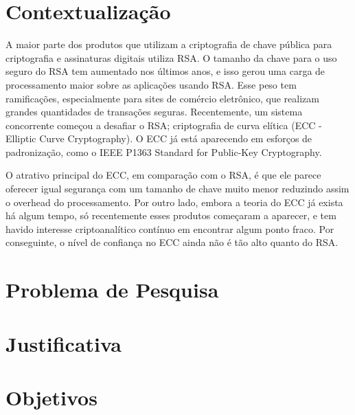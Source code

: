 









\frenchspacing 
\imprimircapa

\textual

\section*{Contextualização}

A maior parte dos produtos que utilizam a criptografia de chave pública para criptografia e assinaturas digitais utiliza RSA. O tamanho da chave para o uso seguro do RSA tem aumentado nos últimos anos, e isso gerou uma carga de processamento maior sobre as aplicações usando RSA. Esse peso tem ramificações, especialmente para sites de comércio eletrônico, que realizam grandes quantidades de transações seguras. Recentemente, um sistema concorrente começou a desafiar o RSA; criptografia de curva elítica (ECC - Elliptic Curve Cryptography). O ECC já está aparecendo em esforços de padronização, como o IEEE P1363 Standard for Public-Key Cryptography. \cite{Stallings:2011}

O atrativo principal do ECC, em comparação com o RSA, é que ele parece oferecer igual segurança com um tamanho de chave muito menor reduzindo assim o overhead do processamento. Por outro lado, embora a teoria do ECC já exista há algum tempo, só recentemente esses produtos começaram a aparecer, e tem havido interesse criptoanalítico contínuo em encontrar algum ponto fraco. Por conseguinte, o nível de confiança no ECC ainda não é tão alto quanto do RSA. \cite{Stallings:2011}

\section*{Problema de Pesquisa}

\section*{Justificativa}

\section*{Objetivos}

